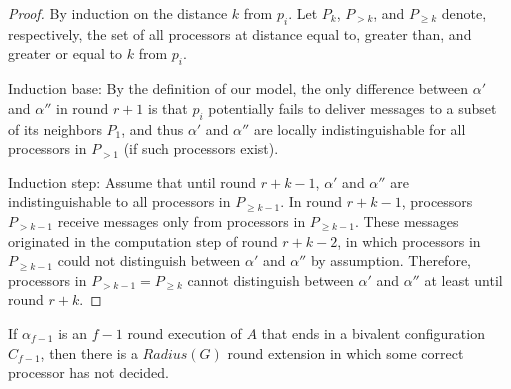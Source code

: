 \begin{proof}
By induction on the distance $k$ from $p_i$. Let $P_k$, $P_{>k}$, and $P_{\geq k}$ denote,
respectively, the set of all processors at distance equal to, greater than, and
greater or equal to $k$ from $p_i$.

Induction base: By the definition of our model, the only difference 
between $\alpha'$ and $\alpha''$ in round $r+1$ is that $p_i$ potentially fails
to deliver messages to a subset of its neighbors $P_1$, and thus $\alpha'$ and $\alpha''$
are locally indistinguishable for all processors in $P_{>1}$ (if such processors exist).

Induction step: Assume that until round $r+k-1$, $\alpha'$ and $\alpha''$ are
indistinguishable to all processors in $P_{\geq k-1}$. In round $r+k-1$, processors
$P_{>k-1}$ receive messages only from processors in $P_{\geq k-1}$. These messages
originated in the computation step of round $r+k-2$, in which processors in $P_{\geq k-1}$
could not distinguish between $\alpha'$ and $\alpha''$ by assumption.
Therefore, processors in $P_{>k-1} = P_{\geq k}$ cannot distinguish between
$\alpha'$ and $\alpha''$ at least until round $r+k$.
\end{proof}


\begin{lemma}
If $\alpha_{f-1}$ is an $f-1$ round execution of $A$ that ends in a bivalent
configuration $C_{f-1}$, then there is a $Radius(G)$ round extension in which
some correct processor has not decided.
\end{lemma}

